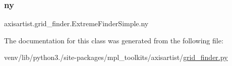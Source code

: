 \mbox{\label{classaxisartist_1_1grid__finder_1_1ExtremeFinderSimple_a12a07cc0177a1e2cb1aa0dbbc3ef161f}} 
\subsubsection{\texorpdfstring{ny}{ny}}
{\footnotesize\ttfamily axisartist.\+grid\+\_\+finder.\+Extreme\+Finder\+Simple.\+ny}



The documentation for this class was generated from the following file\+:\begin{DoxyCompactItemize}
\item 
venv/lib/python3./site-\/packages/mpl\+\_\+toolkits/axisartist/\hyperlink{axisartist_2grid__finder_8py}{grid\+\_\+finder.\+py}\end{DoxyCompactItemize}
